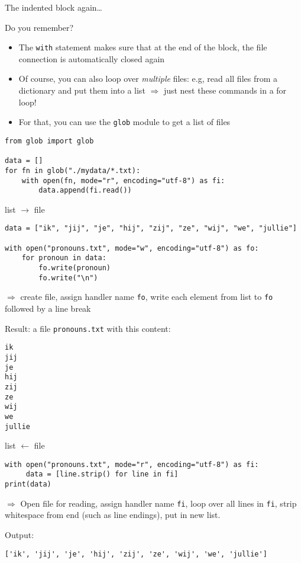 \begin{frame}[fragile]{The indented block again\ldots}
	
\begin{block}{Do you remember?}
	\begin{itemize}
		\item The \texttt{with} statement makes sure that at the end of the block, the file connection is automatically closed again
		\item Of course, you can also loop over \emph{multiple} files: e.g, read all files from a dictionary and put them into a list $\Rightarrow$ just nest these commands in a for loop!
		\item For that, you can use the \texttt{glob} module to get a list of files
	\end{itemize}
\end{block}

\pause

\begin{lstlisting}
from glob import glob

data = []
for fn in glob("./mydata/*.txt):
    with open(fn, mode="r", encoding="utf-8") as fi:
        data.append(fi.read())
\end{lstlisting}


\end{frame}





\begin{frame}[fragile]{list $\rightarrow$ file}
\begin{lstlisting}
data = ["ik", "jij", "je", "hij", "zij", "ze", "wij", "we", "jullie"]

with open("pronouns.txt", mode="w", encoding="utf-8") as fo:
    for pronoun in data:
        fo.write(pronoun)
        fo.write("\n")
\end{lstlisting}
$\Rightarrow$ create file, assign handler name \texttt{fo}, write each element from list to \texttt{fo} followed by a line break

Result: a file \texttt{pronouns.txt} with this content:
\begin{lstlisting}
ik
jij
je
hij
zij
ze
wij
we
jullie
\end{lstlisting}
\end{frame}



\begin{frame}[fragile]{list $\leftarrow$ file}
\begin{lstlisting}
with open("pronouns.txt", mode="r", encoding="utf-8") as fi:
     data = [line.strip() for line in fi]
print(data)
\end{lstlisting}
$\Rightarrow$ Open file for reading, assign handler name \texttt{fi}, loop over all lines in \texttt{fi}, strip whitespace from end (such as line endings), put in new list.

Output:
\begin{lstlisting}
['ik', 'jij', 'je', 'hij', 'zij', 'ze', 'wij', 'we', 'jullie']
\end{lstlisting}
\end{frame}



